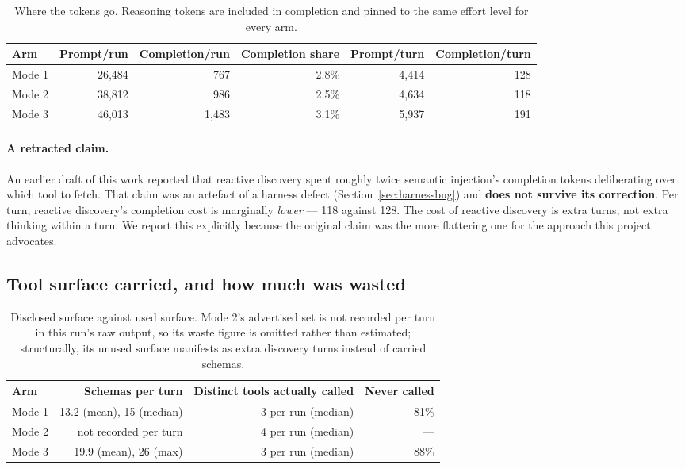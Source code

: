 \documentclass[11pt,a4paper]{article}
\begin{document}
\begin{table}[h]
\centering
\small
\begin{tabular}{@{}lrrrrr@{}}
\toprule
\textbf{Arm} & \textbf{Prompt/run} & \textbf{Completion/run} & \textbf{Completion share} & \textbf{Prompt/turn} & \textbf{Completion/turn} \\
\midrule
Mode 1 & 26,484 & 767   & 2.8\% & 4,414 & 128 \\
Mode 2 & 38,812 & 986   & 2.5\% & 4,634 & 118 \\
Mode 3 & 46,013 & 1,483 & 3.1\% & 5,937 & 191 \\
\bottomrule
\end{tabular}
\caption{Where the tokens go. Reasoning tokens are included in completion and pinned to the same
effort level for every arm.}
\label{tab:split}
\end{table}

\paragraph{A retracted claim.} An earlier draft of this work reported that reactive discovery spent
roughly twice semantic injection's completion tokens deliberating over which tool to fetch. That
claim was an artefact of a harness defect (Section~\ref{sec:harnessbug}) and \textbf{does not survive
its correction}. Per turn, reactive discovery's completion cost is marginally \emph{lower} --- 118
against 128. The cost of reactive discovery is extra turns, not extra thinking within a turn. We
report this explicitly because the original claim was the more flattering one for the approach this
project advocates.

\subsection{Tool surface carried, and how much was wasted}

\begin{table}[h]
\centering
\small
\begin{tabular}{@{}lrrr@{}}
\toprule
\textbf{Arm} & \textbf{Schemas per turn} & \textbf{Distinct tools actually called} & \textbf{Never called} \\
\midrule
Mode 1 & 13.2 (mean), 15 (median) & 3 per run (median) & 81\% \\
Mode 2 & not recorded per turn    & 4 per run (median) & --- \\
Mode 3 & 19.9 (mean), 26 (max)    & 3 per run (median) & 88\% \\
\bottomrule
\end{tabular}
\caption{Disclosed surface against used surface. Mode 2's advertised set is not recorded per turn in
this run's raw output, so its waste figure is omitted rather than estimated; structurally, its
unused surface manifests as extra discovery turns instead of carried schemas.}
\label{tab:waste}
\end{table}
\end{document}
